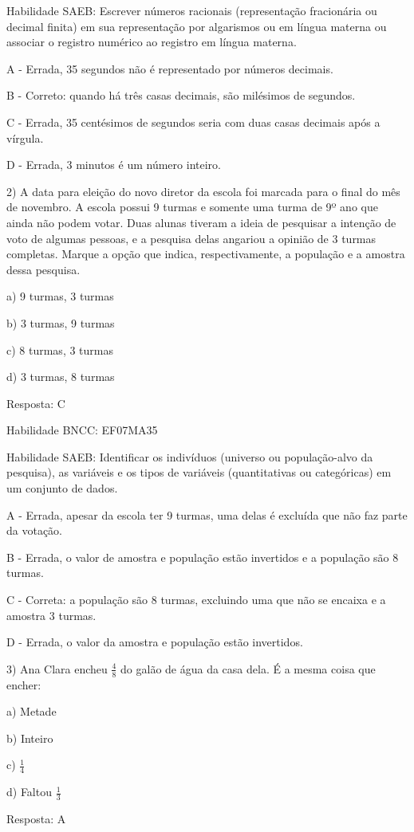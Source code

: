 Habilidade SAEB: Escrever números racionais (representação fracionária
ou decimal finita) em sua representação por algarismos ou em língua
materna ou associar o registro numérico ao registro em língua materna.

A - Errada, 35 segundos não é representado por números decimais.

B - Correto: quando há três casas decimais, são milésimos de segundos.

C - Errada, 35 centésimos de segundos seria com duas casas decimais após
a vírgula.

D - Errada, 3 minutos é um número inteiro.

2) A data para eleição do novo diretor da escola foi marcada para o
final do mês de novembro. A escola possui 9 turmas e somente uma turma
de 9º ano que ainda não podem votar. Duas alunas tiveram a ideia de
pesquisar a intenção de voto de algumas pessoas, e a pesquisa delas
angariou a opinião de 3 turmas completas. Marque a opção que indica,
respectivamente, a população e a amostra dessa pesquisa.~

a) 9 turmas, 3 turmas

b) 3 turmas, 9 turmas

c) 8 turmas, 3 turmas

d) 3 turmas, 8 turmas

Resposta: C

Habilidade BNCC: EF07MA35

Habilidade SAEB: Identificar os indivíduos (universo ou população-alvo
da pesquisa), as variáveis e os tipos de variáveis (quantitativas ou
categóricas) em um conjunto de dados.

A - Errada, apesar da escola ter 9 turmas, uma delas é excluída que não
faz parte da votação.

B - Errada, o valor de amostra e população estão invertidos e a
população são 8 turmas.

C - Correta: a população são 8 turmas, excluindo uma que não se encaixa
e a amostra 3 turmas.

D - Errada, o valor da amostra e população estão invertidos.

3) Ana Clara encheu \(\frac{4}{8}\) do galão de água da casa dela. É a
mesma coisa que encher:

a) Metade

b) Inteiro

c) \(\frac{1}{4}\)

d) Faltou \(\frac{1}{3}\)

Resposta: A

